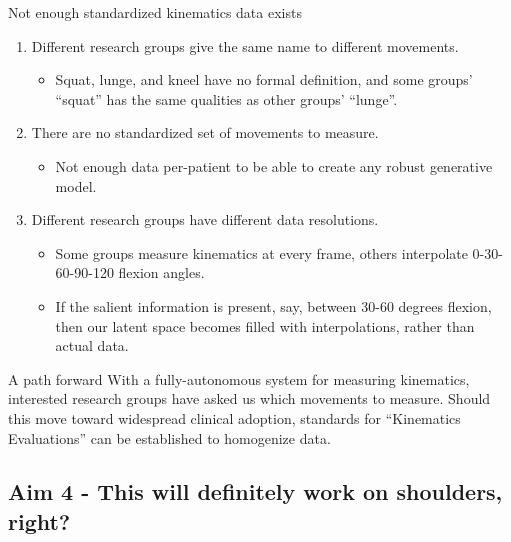 \documentclass[presentation, aspectratio=1610]{beamer}
\begin{document}
\begin{frame}[label={sec:org82234b9}]{Not enough standardized kinematics data exists}
\begin{enumerate}
\item Different research groups give the same name to different movements.
\begin{itemize}
\item Squat, lunge, and kneel have no formal definition, and some groups' ``squat'' has the same qualities as other groups' ``lunge''.
\end{itemize}
\item There are no standardized set of movements to measure.
\begin{itemize}
\item Not enough data per-patient to be able to create any robust generative model.
\end{itemize}
\item Different research groups have different data resolutions.
\begin{itemize}
\item Some groups measure kinematics at every frame, others interpolate 0-30-60-90-120 flexion angles.
\item If the salient information is present, say, between 30-60 degrees flexion, then our latent space becomes filled with interpolations, rather than actual data.
\end{itemize}
\end{enumerate}
\end{frame}
\begin{frame}[label={sec:org6541e89}]{A path forward}
With a fully-autonomous system for measuring kinematics, interested research groups have asked us which movements to measure. Should this move toward widespread clinical adoption, standards for ``Kinematics Evaluations'' can be established to homogenize data.
\end{frame}
\subsection{Aim 4 - This will definitely work on shoulders, right?}
\label{sec:org4530e22}
\end{document}
